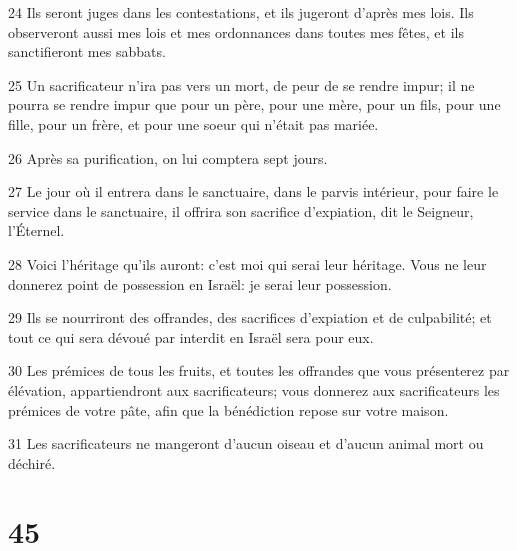 \par 24 Ils seront juges dans les contestations, et ils jugeront d'après mes lois. Ils observeront aussi mes lois et mes ordonnances dans toutes mes fêtes, et ils sanctifieront mes sabbats.
\par 25 Un sacrificateur n'ira pas vers un mort, de peur de se rendre impur; il ne pourra se rendre impur que pour un père, pour une mère, pour un fils, pour une fille, pour un frère, et pour une soeur qui n'était pas mariée.
\par 26 Après sa purification, on lui comptera sept jours.
\par 27 Le jour où il entrera dans le sanctuaire, dans le parvis intérieur, pour faire le service dans le sanctuaire, il offrira son sacrifice d'expiation, dit le Seigneur, l'Éternel.
\par 28 Voici l'héritage qu'ils auront: c'est moi qui serai leur héritage. Vous ne leur donnerez point de possession en Israël: je serai leur possession.
\par 29 Ils se nourriront des offrandes, des sacrifices d'expiation et de culpabilité; et tout ce qui sera dévoué par interdit en Israël sera pour eux.
\par 30 Les prémices de tous les fruits, et toutes les offrandes que vous présenterez par élévation, appartiendront aux sacrificateurs; vous donnerez aux sacrificateurs les prémices de votre pâte, afin que la bénédiction repose sur votre maison.
\par 31 Les sacrificateurs ne mangeront d'aucun oiseau et d'aucun animal mort ou déchiré.

\chapter{45}

